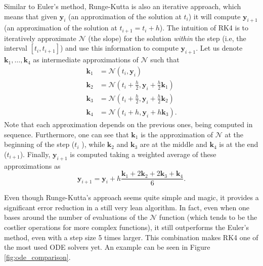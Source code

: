 Similar to Euler's method, Runge-Kutta is also an iterative approach, which means that given $\bm{y}_i$ (an approximation of the solution at $t_i$) it will compute $\bm{y}_{i+1}$ (an approximation of the solution at $t_{i+1}=t_i + h$).
The intuition of RK4 is to iteratively approximate $\mathcal{N}$ (the slope) for the solution \emph{within} the step (i.e, the interval $\left[ t_i,t_{i+1} \right] $) and use this information to compute $\bm{y}_{i+1}$.
Let us denote $\bm{k}_1,\ldots,\bm{k}_4$ as intermediate approximations of $\mathcal{N}$ such that
\begin{align*}
    \bm{k}_1 &= \mathcal{N}\left( t_i , \bm{y}_i \right)  \\
    \bm{k}_2 &= \mathcal{N}\left( t_i+\frac{h}{2}, \bm{y}_i + \frac{h}{2}\bm{k}_1 \right)  \\
    \bm{k}_3 &= \mathcal{N}\left( t_i+\frac{h}{2}, \bm{y}_i + \frac{h}{2}\bm{k}_2 \right)  \\
    \bm{k}_4 &= \mathcal{N}\left( t_i+h, \bm{y}_i + h \bm{k}_3 \right)
.\end{align*}
Note that each approximation depends on the previous ones, being computed in sequence.
Furthermore, one can see that $\bm{k}_1$ is the approximation of $\mathcal{N}$ at the beginning of the step ($t_i$ ), while $\bm{k}_2$ and $\bm{k}_3$ are at the middle and $\bm{k}_4$ is at the end ($t_{i+1}$).
Finally, $\bm{y}_{i+1}$ is computed taking a weighted average of these approximations as \[
    \bm{y}_{i+1} = \bm{y}_i + h \frac{\bm{k}_1 + 2\bm{k}_2 + 2 \bm{k}_3 + \bm{k}_4}{6}
.\]

Even though Runge-Kutta's approach seems quite simple and magic, it provides a significant error reduction in a still very lean algorithm.
In fact, even when one bases around the number of evaluations of the $\mathcal{N}$ function (which tends to be the costlier operations for more complex functions), it still outperforms the Euler's method, even with a step size 5 times larger\footnotemark.
This combination makes RK4 one of the most used ODE solvers yet.
An example can be seen in Figure \ref{fig:ode_comparison}.

